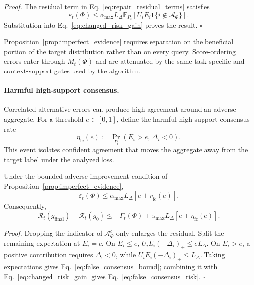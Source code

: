 \noindent\emph{Proof.}
The residual term in Eq.~\eqref{eq:repair_residual_terms} satisfies
\[
\varepsilon_t(\Phi)
\leq\alpha_{\max}L_\Delta
\mathbb E_{P_t}[U_iE_i\mathbf 1\{i\notin\mathcal A_\Phi\}].
\]
Substitution into Eq.~\eqref{eq:changed_risk_gain} proves the result.
\hfill$\square$

Proposition~\ref{prop:imperfect_evidence} requires separation on the
beneficial portion of the target distribution rather than on every query.
Score-ordering errors enter through $M_t(\Phi)$ and are attenuated by the
same task-specific and context-support gates used by the algorithm.

\paragraph{Harmful high-support consensus.}
\label{app:harmful-consensus}

Correlated alternative errors can produce high agreement around an adverse
aggregate. For a threshold $e\in[0,1]$, define the harmful high-support
consensus rate
\begin{equation}
\eta_{\mathrm{fc}}(e)
:=\Pr_{P_t}(E_i>e,\ \Delta_i<0).
\label{eq:false_consensus_rate}
\end{equation}
This event isolates confident agreement that moves the aggregate away from
the target label under the analyzed loss.

\begin{proposition}
\label{prop:false_consensus}
Under the bounded adverse improvement condition of
Proposition~\ref{prop:imperfect_evidence},
\begin{equation}
\varepsilon_t(\Phi)
\leq\alpha_{\max}L_\Delta
\left[e+\eta_{\mathrm{fc}}(e)\right].
\label{eq:false_consensus_bound}
\end{equation}
Consequently,
\begin{equation}
\mathcal R_t(g_{\mathrm{final}})-\mathcal R_t(g_0)
\leq-\Gamma_t(\Phi)
+\alpha_{\max}L_\Delta
\left[e+\eta_{\mathrm{fc}}(e)\right].
\label{eq:false_consensus_risk}
\end{equation}
\end{proposition}

\noindent\emph{Proof.}
Dropping the indicator of $\mathcal A_\Phi^c$ only enlarges the residual.
Split the remaining expectation at $E_i=e$.  On $E_i\leq e$,
$U_iE_i(-\Delta_i)_+\leq eL_\Delta$.  On $E_i>e$, a positive contribution
requires $\Delta_i<0$, while $U_iE_i(-\Delta_i)_+\leq L_\Delta$.
Taking expectations gives Eq.~\eqref{eq:false_consensus_bound}; combining it
with Eq.~\eqref{eq:changed_risk_gain} gives
Eq.~\eqref{eq:false_consensus_risk}. \hfill$\square$

